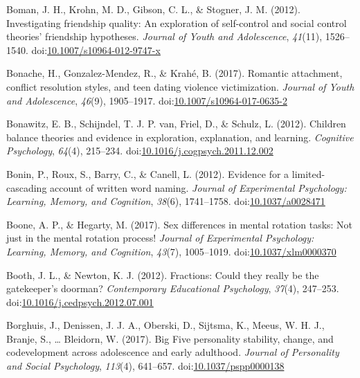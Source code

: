 \documentclass[english,man]{apa6}
\theoremstyle{definition}
\theoremstyle{definition}
\theoremstyle{definition}
\theoremstyle{remark}
\begin{document}
\hypertarget{ref-BomanIV2012}{}
Boman, J. H., Krohn, M. D., Gibson, C. L., \& Stogner, J. M. (2012).
Investigating friendship quality: An exploration of self-control and
social control theories' friendship hypotheses. \emph{Journal of Youth
and Adolescence}, \emph{41}(11), 1526--1540.
doi:\href{https://doi.org/10.1007/s10964-012-9747-x}{10.1007/s10964-012-9747-x}

\hypertarget{ref-Bonache2017}{}
Bonache, H., Gonzalez-Mendez, R., \& Krahé, B. (2017). Romantic
attachment, conflict resolution styles, and teen dating violence
victimization. \emph{Journal of Youth and Adolescence}, \emph{46}(9),
1905--1917.
doi:\href{https://doi.org/10.1007/s10964-017-0635-2}{10.1007/s10964-017-0635-2}

\hypertarget{ref-Bonawitz2012}{}
Bonawitz, E. B., Schijndel, T. J. P. van, Friel, D., \& Schulz, L.
(2012). Children balance theories and evidence in exploration,
explanation, and learning. \emph{Cognitive Psychology}, \emph{64}(4),
215--234.
doi:\href{https://doi.org/10.1016/j.cogpsych.2011.12.002}{10.1016/j.cogpsych.2011.12.002}

\hypertarget{ref-Bonin2012}{}
Bonin, P., Roux, S., Barry, C., \& Canell, L. (2012). Evidence for a
limited-cascading account of written word naming. \emph{Journal of
Experimental Psychology: Learning, Memory, and Cognition}, \emph{38}(6),
1741--1758.
doi:\href{https://doi.org/10.1037/a0028471}{10.1037/a0028471}

\hypertarget{ref-Boone2017}{}
Boone, A. P., \& Hegarty, M. (2017). Sex differences in mental rotation
tasks: Not just in the mental rotation process! \emph{Journal of
Experimental Psychology: Learning, Memory, and Cognition}, \emph{43}(7),
1005--1019.
doi:\href{https://doi.org/10.1037/xlm0000370}{10.1037/xlm0000370}

\hypertarget{ref-Booth2012}{}
Booth, J. L., \& Newton, K. J. (2012). Fractions: Could they really be
the gatekeeper's doorman? \emph{Contemporary Educational Psychology},
\emph{37}(4), 247--253.
doi:\href{https://doi.org/10.1016/j.cedpsych.2012.07.001}{10.1016/j.cedpsych.2012.07.001}

\hypertarget{ref-Borghuis2017}{}
Borghuis, J., Denissen, J. J. A., Oberski, D., Sijtsma, K., Meeus, W. H.
J., Branje, S., \ldots{} Bleidorn, W. (2017). Big Five personality
stability, change, and codevelopment across adolescence and early
adulthood. \emph{Journal of Personality and Social Psychology},
\emph{113}(4), 641--657.
doi:\href{https://doi.org/10.1037/pspp0000138}{10.1037/pspp0000138}
\end{document}
